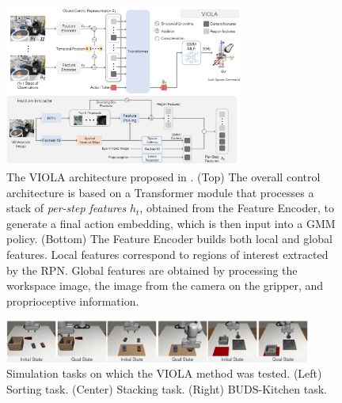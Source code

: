 \begin{figure}[t]
    \centering
    \includegraphics[width=0.7\textwidth]{figures/images/viola/viola_architecture.jpg}
        \caption{The VIOLA architecture proposed in \cite{zhu2023viola}. (Top) The overall control architecture is based on a Transformer module that processes a stack of \textit{per-step features} $h_{t}$, obtained from the Feature Encoder, to generate a final action embedding, which is then input into a GMM policy. (Bottom) The Feature Encoder builds both local and global features. Local features correspond to regions of interest extracted by the RPN. Global features are obtained by processing the workspace image, the image from the camera on the gripper, and proprioceptive information.
        }
    \label{fig:viola_architecture}
    
\end{figure}

\begin{figure}[t]
    \centering
    \includegraphics[width=0.9\textwidth]{figures/images/viola/viola_task.jpg}
    \caption{Simulation tasks on which the VIOLA \cite{zhu2023viola} method was tested. (Left) Sorting task. (Center) Stacking task. (Right) BUDS-Kitchen task.}
    \label{fig:viola_task}
    
\end{figure}
